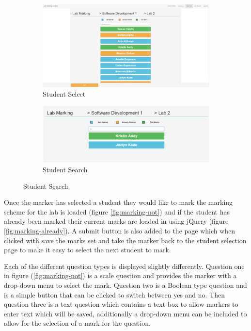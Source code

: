 \documentclass[12pt]{article}  %
\begin{document}
\begin{figure}[H]
\caption{Selecting Student Page}
\centering
\begin{subfigure}[c]{0.45\textwidth}
    \includegraphics[width=1\textwidth]{images/implementation/marking-3-page.png}
    \caption{Student Select}
    \label{fig:marking-student}
\end{subfigure}
\hfill
\begin{subfigure}[c]{0.45\textwidth}
    \includegraphics[width=1\textwidth]{images/implementation/marking-4-page.png}
    \caption{Student Search}
    \label{fig:marking-search}
\end{subfigure}

\end{figure}

\noindent Once the marker has selected a student they would like to mark the marking scheme for the lab is loaded (figure \ref{fig:marking-not}) and if the student has already been marked their current marks are loaded in using jQuery (figure \ref{fig:marking-already}). A submit button is also added to the page which when clicked with save the marks set and take the marker back to the student selection page to make it easy to select the next student to mark.

Each of the different question types is displayed slightly differently. Question one in figure (\ref{fig:marking-not}) is a scale question and provides the marker with a drop-down menu to select the mark. Question two is a Boolean type question and is a simple button that can be clicked to switch between yes and no. Then question three is a text question which contains a text-box to allow markers to enter text which will be saved, additionally a drop-down menu can be included to allow for the selection of a mark for the question. 
\end{document}

